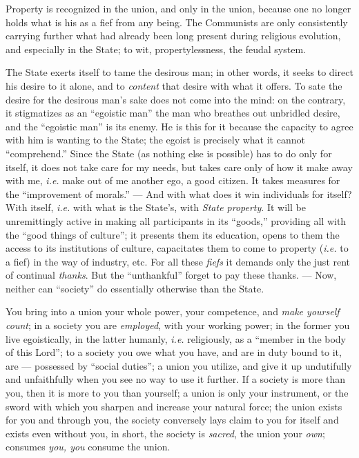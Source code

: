 Property is recognized in the union, and only in the union, because one no 
longer holds what is his as a fief from any being. The Communists are only 
consistently carrying further what had already been long present during 
religious evolution, and especially in the State; to wit, propertylessness, 
the feudal system.

The State exerts itself to tame the desirous man; in other words, it seeks to 
direct his desire to it alone, and to \textit{content} that desire with what 
it offers. To sate the desire for the desirous man's sake does not come into 
the mind: on the contrary, it stigmatizes as an ``egoistic man'' the man who 
breathes out unbridled desire, and the ``egoistic man'' is its enemy. He is 
this for it because the capacity to agree with him is wanting to the State; 
the egoist is precisely what it cannot ``comprehend.'' Since the State (as 
nothing else is possible) has to do only for itself, it does not take care for 
my needs, but takes care only of how it make away with me, \textit{i.e.} make 
out of me another ego, a good citizen. It takes measures for the 
``improvement of morals.'' --- And with what does it win individuals for 
itself? With itself, \textit{i.e.} with what is the State's, with 
\textit{State property}. It will be unremittingly active in making all 
participants in its ``goods,'' providing all with the ``good things of 
culture''; it presents them its education, opens to them the access to its 
institutions of culture, capacitates them to come to property (\textit{i.e.} 
to a fief) in the way of industry, etc. For all these \textit{fiefs} it 
demands only the just rent of continual \textit{thanks}. But the 
``unthankful'' forget to pay these thanks. --- Now, neither can ``society'' 
do essentially otherwise than the State.

You bring into a union your whole power, your competence, and \textit{make 
yourself count}; in a society you are \textit{employed}, with your working 
power; in the former you live egoistically, in the latter humanly, 
\textit{i.e.} religiously, as a ``member in the body of this Lord''; to a 
society you owe what you have, and are in duty bound to it, are --- possessed 
by ``social duties''; a union you utilize, and give it up undutifully and 
unfaithfully when you see no way to use it further. If a society is more than 
you, then it is more to you than yourself; a union is only your instrument, or 
the sword with which you sharpen and increase your natural force; the union 
exists for you and through you, the society conversely lays claim to you for 
itself and exists even without you, in short, the society is \textit{sacred}, 
the union your \textit{own}; consumes \textit{you, you} consume the union.

